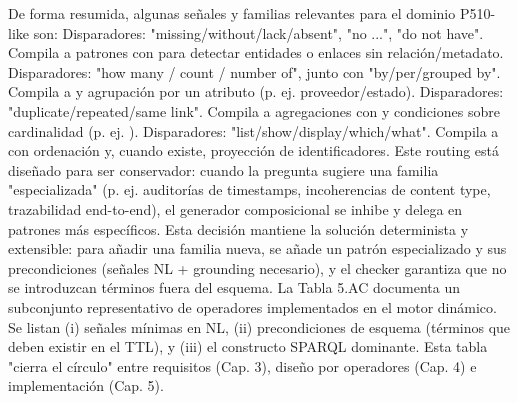 {}De forma resumida, algunas señales y familias relevantes para el dominio P510-like son:\markdownRendererInterblockSeparator
{}\markdownRendererUlBeginTight
\markdownRendererUlItem {} Disparadores: "missing/without/lack/absent", "no ...", "do not have". Compila a patrones con  para detectar entidades o enlaces sin relación/metadato.\markdownRendererUlItemEnd 
\markdownRendererUlItem {} Disparadores: "how many / count / number of", junto con "by/per/grouped by". Compila a  y agrupación por un atributo (p. ej. proveedor/estado).\markdownRendererUlItemEnd 
\markdownRendererUlItem {} Disparadores: "duplicate/repeated/same link". Compila a agregaciones con  y condiciones sobre cardinalidad (p. ej. ).\markdownRendererUlItemEnd 
\markdownRendererUlItem {} Disparadores: "list/show/display/which/what". Compila a  con ordenación y, cuando existe, proyección de identificadores.\markdownRendererUlItemEnd 
\markdownRendererUlEndTight \markdownRendererInterblockSeparator
{}Este routing está diseñado para ser conservador: cuando la pregunta sugiere una familia "especializada" (p. ej. auditorías de timestamps, incoherencias de content type, trazabilidad end-to-end), el generador composicional se inhibe y delega en patrones más específicos.\markdownRendererInterblockSeparator
{}Esta decisión mantiene la solución determinista y extensible: para añadir una familia nueva, se añade un patrón especializado y sus precondiciones (señales NL + grounding necesario), y el checker garantiza que no se introduzcan términos fuera del esquema.\markdownRendererInterblockSeparator
{}\markdownRendererInterblockSeparator
{}La Tabla 5.AC documenta un subconjunto representativo de operadores implementados en el motor dinámico. Se listan (i) señales mínimas en NL, (ii) precondiciones de esquema (términos  que deben existir en el TTL), y (iii) el constructo SPARQL dominante. Esta tabla "cierra el círculo" entre requisitos (Cap. 3), diseño por operadores (Cap. 4) e implementación (Cap. 5).\markdownRendererInterblockSeparator

